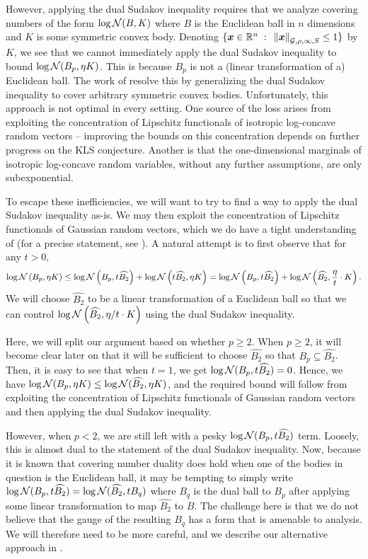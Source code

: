 \documentclass[11pt]{article}
\numberwithin{equation}{section}
\begin{document}
However, applying the dual Sudakov inequality requires that we analyze covering numbers of the form $\log\mathcal{N}(B, K)$ where $B$ is the Euclidean ball in $n$ dimensions and $K$ is some symmetric convex body. Denoting $\{\bm{x}\in\mathbb{R}^n{\;\; : \;\;}\left\lVert \bm{x} \right\rVert_{\mathcal{G},\rho,\infty, S}\le 1\}$ by $K$, we see that we cannot immediately apply the dual Sudakov inequality to bound $\log\mathcal{N}(B_p,\eta K)$. This is because $B_p$ is not a (linear transformation of a) Euclidean ball. The work of \cite{jlls23} resolve this by generalizing the dual Sudakov inequality to cover arbitrary symmetric convex bodies. Unfortunately, this approach is not optimal in every setting. One source of the loss arises from exploiting the concentration of Lipschitz functionals of isotropic log-concave random vectors -- improving the bounds on this concentration depends on further progress on the KLS conjecture. Another is that the one-dimensional marginals of isotropic log-concave random variables, without any further assumptions, are only subexponential.

To escape these inefficiencies, we will want to try to find a way to apply the dual Sudakov inequality as-is. We may then exploit the concentration of Lipschitz functionals of Gaussian random vectors, which we do have a tight understanding of (for a precise statement, see ). A natural attempt is to first observe that for any $t > 0$,
\begin{align}
    \log\mathcal{N}\left(B_p, \eta K\right) \le \log\mathcal{N}\left(B_p, t\widehat{B_2}\right) + \log\mathcal{N}\left(t\widehat{B_2}, \eta K\right) = \log\mathcal{N}\left(B_p, t\widehat{B_2}\right) + \log\mathcal{N}\left(\widehat{B_2}, \frac{\eta}{t}\cdot K\right).\label{eq:intro_split_covering}
\end{align}
We will choose $\widehat{B_2}$ to be a linear transformation of a Euclidean ball so that we can control $\log\mathcal{N}\left(\widehat{B_2}, \eta/t \cdot K\right)$ using the dual Sudakov inequality. 

Here, we will split our argument based on whether $p \ge 2$. When $p \ge 2$, it will become clear later on that it will be sufficient to choose $\widehat{B_2}$ so that $B_p \subseteq \widehat{B_2}$. Then, it is easy to see that when $t=1$, we get $\log\mathcal{N}(B_p,t\widehat{B_2}) = 0$. Hence, we have $\log\mathcal{N}(B_p, \eta K) \le \log\mathcal{N}(\widehat{B_2}, \eta K)$, and the required bound will follow from exploiting the concentration of Lipschitz functionals of Gaussian random vectors and then applying the dual Sudakov inequality.

However, when $p < 2$, we are still left with a pesky $\log\mathcal{N}(B_p,t \widehat{B_2})$ term. Loosely, this is almost dual to the statement of the dual Sudakov inequality. Now, because it is known that covering number duality does hold when one of the bodies in question is the Euclidean ball, it may be tempting to simply write $\log\mathcal{N}(B_p, t\widehat{B_2}) = \log\mathcal{N}(\widehat{B_2},t B_q)$ where $B_q$ is the dual ball to $B_p$ after applying some linear transformation to map $\widehat{B_2}$ to $B$. The challenge here is that we do not believe that the gauge of the resulting $B_q$ has a form that is amenable to analysis. We will therefore need to be more careful, and we describe our alternative approach in .
\end{document}
